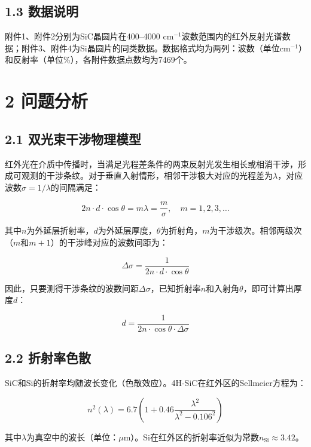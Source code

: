 \documentclass[withoutpreface]{cumcmthesis}
\begin{document}
\subsection{1.3 数据说明}
附件1、附件2分别为SiC晶圆片在400--4000 cm$^{-1}$波数范围内的红外反射光谱数据；附件3、附件4为Si晶圆片的同类数据。数据格式均为两列：波数（单位cm$^{-1}$）和反射率（单位\%），各附件数据点数均为7469个。

\section{2 问题分析}

\subsection{2.1 双光束干涉物理模型}
红外光在介质中传播时，当满足光程差条件的两束反射光发生相长或相消干涉，形成可观测的干涉条纹。对于垂直入射情形，相邻干涉极大对应的光程差为$\lambda$，对应波数$\sigma=1/\lambda$的间隔满足：

\begin{equation}
2n \cdot d \cdot \cos\theta = m\lambda = \frac{m}{\sigma}, \quad m=1,2,3,\dots
\end{equation}

其中$n$为外延层折射率，$d$为外延层厚度，$\theta$为折射角，$m$为干涉级次。相邻两级次（$m$和$m+1$）的干涉峰对应的波数间距为：

\begin{equation}
\Delta\sigma = \frac{1}{2n\cdot d\cdot\cos\theta}
\end{equation}

因此，只要测得干涉条纹的波数间距$\Delta\sigma$，已知折射率$n$和入射角$\theta$，即可计算出厚度$d$：

\begin{equation}
d = \frac{1}{2n\cdot\cos\theta\cdot\Delta\sigma}
\end{equation}

\subsection{2.2 折射率色散}
SiC和Si的折射率均随波长变化（色散效应）。4H-SiC在红外区的Sellmeier方程为：

\begin{equation}
n^2(\lambda) = 6.7\left(1 + 0.46\frac{\lambda^2}{\lambda^2 - 0.106^2}\right)
\end{equation}

其中$\lambda$为真空中的波长（单位：$\mu$m）。Si在红外区的折射率近似为常数$n_{\text{Si}}\approx 3.42$。
\end{document}
